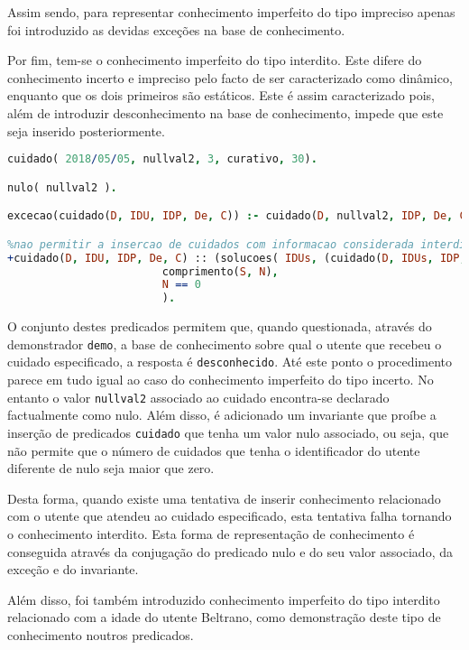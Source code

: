 \documentclass[a4paper]{article}
\begin{document}
Assim sendo, para representar conhecimento imperfeito do tipo impreciso apenas foi introduzido as devidas exceções na base de conhecimento.

Por fim, tem-se o conhecimento imperfeito do tipo interdito. Este difere do conhecimento incerto e impreciso pelo facto de ser caracterizado como dinâmico, enquanto que os dois primeiros são estáticos. Este é assim caracterizado pois, além de introduzir desconhecimento na base de conhecimento, impede que este seja inserido posteriormente.

\begin{lstlisting}[language=Prolog, caption=Exemplo de conhecimento imperfeito do tipo interdito.]
cuidado( 2018/05/05, nullval2, 3, curativo, 30).

nulo( nullval2 ).

excecao(cuidado(D, IDU, IDP, De, C)) :- cuidado(D, nullval2, IDP, De, C).

%nao permitir a insercao de cuidados com informacao considerada interdita na base de conhecimento.
+cuidado(D, IDU, IDP, De, C) :: (solucoes( IDUs, (cuidado(D, IDUs, IDP, De, C), nao( nulo( IDUs ) ) ), S),
                        comprimento(S, N),
                        N == 0
                        ).
\end{lstlisting}

O conjunto destes predicados permitem que, quando questionada, através do demonstrador \texttt{demo}, a base de conhecimento sobre qual o utente que recebeu o cuidado especificado, a resposta é \texttt{desconhecido}. Até este ponto o procedimento parece em tudo igual ao caso do conhecimento imperfeito do tipo incerto. No entanto o valor \texttt{nullval2} associado ao cuidado encontra-se declarado factualmente como nulo. Além disso, é adicionado um invariante que proíbe a inserção de predicados \texttt{cuidado} que tenha um valor nulo associado, ou seja, que não permite que o número de cuidados que tenha o identificador do utente diferente de nulo seja maior que zero.

Desta forma, quando existe uma tentativa de inserir conhecimento relacionado com o utente que atendeu ao cuidado especificado, esta tentativa falha tornando o conhecimento interdito. Esta forma de representação de conhecimento é conseguida através da conjugação do predicado nulo e do seu valor associado, da exceção e do invariante.

Além disso, foi também introduzido conhecimento imperfeito do tipo interdito relacionado com a idade do utente Beltrano, como demonstração deste tipo de conhecimento noutros predicados.
\end{document}
